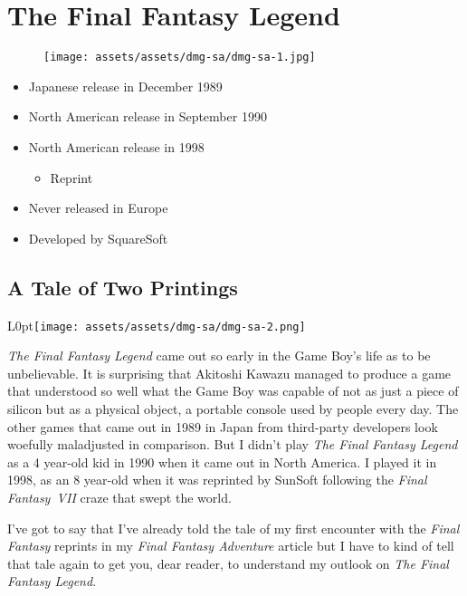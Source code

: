 \documentclass{book}
\begin{document}
\chapter*{The Final Fantasy Legend}
\vspace{\baselineskip}\begin{figure}[H]{\texttt{[image: assets/assets/dmg-sa/dmg-sa-1.jpg]}}\end{figure}\vspace{\baselineskip}
\begin{itemize}[left=0pt, nosep]
\item Japanese release in December 1989
\item North American release in September 1990
\item North American release in 1998
\begin{itemize}
\item Reprint
\end{itemize}
\item Never released in Europe
\item Developed by SquareSoft

\end{itemize}
\newpage\FloatBarrier\section*{A Tale of Two Printings}
\begin{wrapfigure}{L}{0pt}{\texttt{[image: assets/assets/dmg-sa/dmg-sa-2.png]}}\end{wrapfigure}\noindent
\emph{The Final Fantasy Legend} came out so early in the Game Boy’s life as to be unbelievable. It is surprising that Akitoshi Kawazu managed to produce a game that understood so well what the Game Boy was capable of not as just a piece of silicon but as a physical object, a portable console used by people every day. The other games that came out in 1989 in Japan from third-party developers look woefully maladjusted in comparison. But I didn’t play \emph{The Final Fantasy Legend} as a 4 year-old kid in 1990 when it came out in North America. I played it in 1998, as an 8 year-old when it was reprinted by SunSoft following the \emph{Final Fantasy~VII} craze that swept the world.\par
I’ve got to say that I’ve already told the tale of my first encounter with the \emph{Final Fantasy} reprints in my \emph{Final Fantasy Adventure} article but I have to kind of tell that tale again to get you, dear reader, to understand my outlook on \emph{The Final Fantasy Legend}.\par
\end{document}
